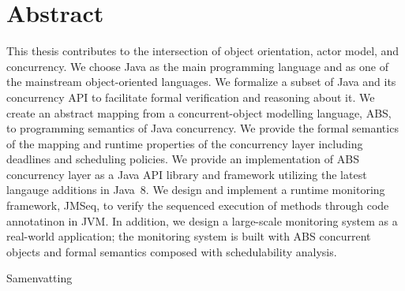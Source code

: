 %
\chapter*{Abstract}
\label{sec:abstract}
\vspace*{-10mm}

This thesis contributes to the intersection of object orientation, actor 
model, and concurrency.
We choose Java as the main programming language and as one of the mainstream 
object-oriented languages. 
We formalize a subset of Java and its concurrency API to 
facilitate formal verification and reasoning about it.
We create an abstract mapping from a concurrent-object modelling language, 
ABS, to programming semantics of Java concurrency. 
We provide the formal semantics of the mapping and runtime properties of 
the concurrency layer including deadlines and scheduling policies.
We provide an implementation of ABS concurrency layer as a Java API library 
and framework utilizing the latest langauge additions 
in Java~8.
We design and implement a runtime monitoring framework, JMSeq, to verify the
sequenced execution of methods through code annotatinon in JVM. 
In addition, we design a large-scale monitoring system as a real-world 
application; the monitoring system is built with ABS concurrent objects 
and formal semantics composed with schedulability analysis.

\vspace*{20mm}

{Samenvatting}\label{sec:abstract-diff} \\

